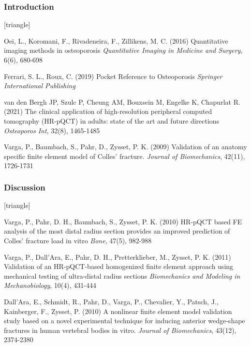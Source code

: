 \documentclass[xcolor=table,11pt]{beamer}
\begin{document}
	\begin{frame}
		\frametitle{Introduction}
		\footnotesize{
				\begin{thebibliography}{99}
						[triangle]
						
						 Oei, L., Koromani, F., Rivadeneira, F., Zillikens, M. C. (2016)
						\newblock Quantitative imaging methods in osteoporosis
						\newblock \textit{Quantitative Imaging in Medicine and Surgery}, 6(6), 680-698
						
						  Ferrari, S. L., Roux, C. (2019)
						\newblock Pocket Reference to Osteoporosis
						\newblock \textit{Springer International Publishing}

						  van den Bergh JP, Szulc P, Cheung AM, Bouxsein M, Engelke K, Chapurlat R. (2021)
						\newblock The clinical application of high-resolution peripheral computed tomography (HR-pQCT) in adults: state of the art and future directions
						\newblock \textit{Osteoporos Int}, 32(8), 1465-1485

						  Varga, P., Baumbach, S., Pahr, D., Zysset, P. K. (2009)
						\newblock Validation of an anatomy specific finite element model of Colles' fracture.
						\newblock \textit{Journal of Biomechanics}, 42(11), 1726-1731
						
					\end{thebibliography}
			}
	\end{frame}

	\begin{frame}
		\frametitle{Discussion}
		\footnotesize{
				\begin{thebibliography}{99}
						\setbeamertemplate{bibliography item}[triangle]

						 Varga, P., Pahr, D. H., Baumbach, S., Zysset, P. K. (2010)
						\newblock HR-pQCT based FE analysis of the most distal radius section provides an improved prediction of Colles' fracture load in vitro
						\newblock \textit{Bone}, 47(5), 982-988

						 Varga, P., Dall'Ara, E., Pahr, D. H., Pretterklieber, M., Zysset, P. K. (2011)
						\newblock Validation of an HR-pQCT-based homogenized finite element approach using mechanical testing of ultra-distal radius sections
						\newblock \textit{Biomechanics and Modeling in Mechanobiology}, 10(4), 431-444

						 Dall'Ara, E., Schmidt, R., Pahr, D., Varga, P., Chevalier, Y., Patsch, J., Kainberger, F., Zysset, P. (2010)
						\newblock A nonlinear finite element model validation study based on a novel experimental technique for inducing anterior wedge-shape fractures in human vertebral bodies in vitro.
						\newblock \textit{Journal of Biomechanics}, 43(12), 2374-2380
						
					\end{thebibliography}
			}
	\end{frame}
\end{document}
